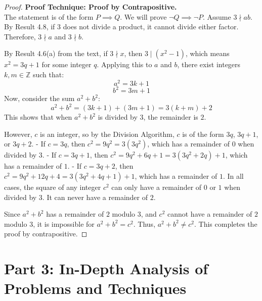 \documentclass[11pt]{article}
\theoremstyle{definition}
\theoremstyle{remark}
\newcommand{\Z}{\mathbb{Z}}
\begin{document}
\begin{proof}
\textbf{Proof Technique: Proof by Contrapositive.} \\
The statement is of the form $P \implies Q$. We will prove $\neg Q \implies \neg P$.
Assume $3 \nmid ab$. By Result 4.8, if $3$ does not divide a product, it cannot divide either factor. Therefore, $3 \nmid a$ and $3 \nmid b$.

By Result 4.6(a) from the text, if $3 \nmid x$, then $3 \mid (x^2 - 1)$, which means $x^2 = 3q + 1$ for some integer $q$.
Applying this to $a$ and $b$, there exist integers $k, m \in \Z$ such that:
\[ a^2 = 3k + 1 \]
\[ b^2 = 3m + 1 \]
Now, consider the sum $a^2 + b^2$:
\[ a^2 + b^2 = (3k + 1) + (3m + 1) = 3(k + m) + 2 \]
This shows that when $a^2 + b^2$ is divided by $3$, the remainder is $2$.

However, $c$ is an integer, so by the Division Algorithm, $c$ is of the form $3q$, $3q+1$, or $3q+2$.
- If $c = 3q$, then $c^2 = 9q^2 = 3(3q^2)$, which has a remainder of $0$ when divided by $3$.
- If $c = 3q+1$, then $c^2 = 9q^2 + 6q + 1 = 3(3q^2 + 2q) + 1$, which has a remainder of $1$.
- If $c = 3q+2$, then $c^2 = 9q^2 + 12q + 4 = 3(3q^2 + 4q + 1) + 1$, which has a remainder of $1$.
In all cases, the square of any integer $c^2$ can only have a remainder of $0$ or $1$ when divided by $3$. It can never have a remainder of $2$.

Since $a^2 + b^2$ has a remainder of $2$ modulo $3$, and $c^2$ cannot have a remainder of $2$ modulo $3$, it is impossible for $a^2 + b^2 = c^2$. Thus, $a^2 + b^2 \neq c^2$.
This completes the proof by contrapositive.
\end{proof}

\newpage
\section{Part 3: In-Depth Analysis of Problems and Techniques}
\end{document}
